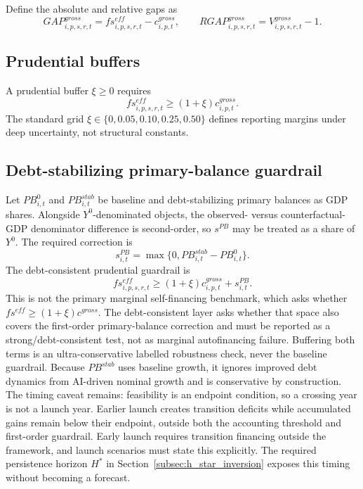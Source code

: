 \documentclass[11pt,a4paper]{article}
\begin{document}
Define the absolute and relative gaps as
\begin{equation}
    GAP^{gross}_{i,p,s,r,t}=fs^{eff}_{i,p,s,r,t}-c^{gross}_{i,p,t},
    \qquad
    RGAP^{gross}_{i,p,s,r,t}=V^{gross}_{i,p,s,r,t}-1.
\end{equation}

\subsection{Prudential buffers}

A prudential buffer $\xi\geq0$ requires
\begin{equation}\label{eq:prudential_main_v10}
    fs^{eff}_{i,p,s,r,t}\geq(1+\xi)c^{gross}_{i,p,t}.
\end{equation}
The standard grid $\xi\in\{0,0.05,0.10,0.25,0.50\}$ defines reporting margins under deep uncertainty, not structural constants.

\subsection{Debt-stabilizing primary-balance guardrail}

Let $PB^0_{i,t}$ and $PB^{stab}_{i,t}$ be baseline and debt-stabilizing primary balances as GDP shares. Alongside $Y^0$-denominated objects, the observed- versus counterfactual-GDP denominator difference is second-order, so $s^{PB}$ may be treated as a share of $Y^0$. The required correction is
\begin{equation}\label{eq:spb_main_v10}
    s^{PB}_{i,t}=\max\{0,PB^{stab}_{i,t}-PB^0_{i,t}\}.
\end{equation}
The debt-consistent prudential guardrail is
\begin{equation}\label{eq:debt_requirement_main_v10}
    fs^{eff}_{i,p,s,r,t}\geq (1+\xi)c^{gross}_{i,p,t}+s^{PB}_{i,t}.
\end{equation}
This is not the primary marginal self-financing benchmark, which asks whether $fs^{eff}\geq(1+\xi)c^{gross}$. The debt-consistent layer asks whether that space also covers the first-order primary-balance correction and must be reported as a strong/debt-consistent test, not as marginal autofinancing failure. Buffering both terms is an ultra-conservative labelled robustness check, never the baseline guardrail.
Because $PB^{stab}$ uses baseline growth, it ignores improved debt dynamics from AI-driven nominal growth and is conservative by construction. The timing caveat remains: feasibility is an endpoint condition, so a crossing year is not a launch year. Earlier launch creates transition deficits while accumulated gains remain below their endpoint, outside both the accounting threshold and first-order guardrail. Early launch requires transition financing outside the framework, and launch scenarios must state this explicitly. The required persistence horizon $H^{*}$ in Section~\ref{subsec:h_star_inversion} exposes this timing without becoming a forecast.
\end{document}
